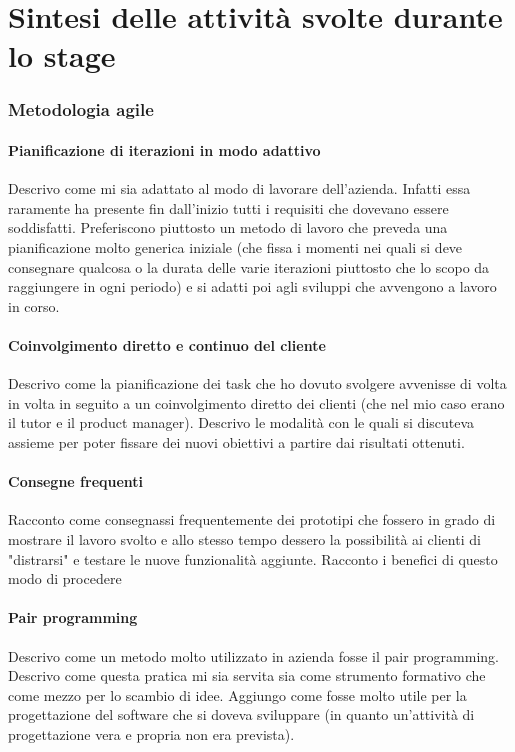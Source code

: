 \part{Sintesi delle attività svolte durante lo stage}
	\section{Metodologia agile}
		\subsection{Pianificazione di iterazioni in modo adattivo}
			Descrivo come mi sia adattato al modo di lavorare dell'azienda. Infatti essa raramente ha presente fin dall'inizio
			tutti i requisiti che dovevano essere soddisfatti. Preferiscono piuttosto un metodo di lavoro che preveda una
			pianificazione molto generica iniziale (che fissa i momenti nei quali si deve consegnare qualcosa o la durata delle
			varie iterazioni piuttosto che lo scopo da raggiungere in ogni periodo) e si adatti poi agli sviluppi che avvengono
			a lavoro in corso.
		\subsection{Coinvolgimento diretto e continuo del cliente}
			Descrivo come la pianificazione dei task che ho dovuto svolgere avvenisse di volta in volta in seguito a un
			coinvolgimento diretto dei clienti (che nel mio  caso erano il tutor e il product manager). Descrivo le modalità con
			le quali si discuteva assieme per poter fissare dei nuovi obiettivi a partire dai risultati ottenuti.
		\subsection{Consegne frequenti}
			Racconto come consegnassi frequentemente dei prototipi che fossero in grado di mostrare il lavoro svolto e allo
			stesso tempo dessero la possibilità ai clienti di "distrarsi" e testare le nuove funzionalità aggiunte. Racconto i
			benefici di questo modo di procedere
		\subsection{Pair programming}
			Descrivo come un metodo molto utilizzato in azienda fosse il pair programming. Descrivo come questa pratica mi sia servita
			sia come strumento formativo che come mezzo per lo scambio di idee. Aggiungo come fosse molto utile per la progettazione
			del software che si doveva sviluppare (in quanto un'attività di progettazione vera e propria non era prevista).
